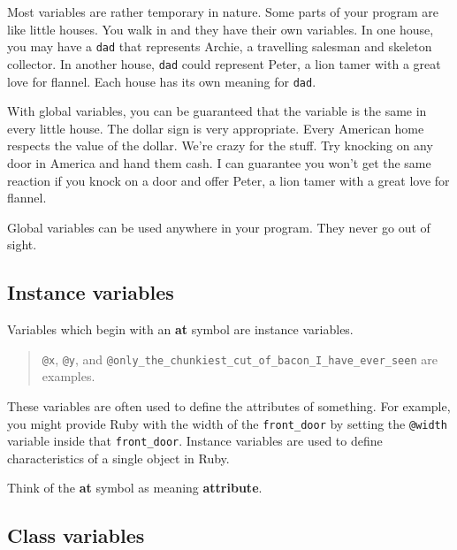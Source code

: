 \documentclass[10pt,twoside]{report}
\begin{document}
Most variables are rather temporary in nature.  Some parts of your
program are like little houses. You walk in and they have their own
variables.  In one house, you may have a
\lstinline[breaklines=true]|dad| that represents Archie, a travelling
salesman and skeleton collector.  In another house,
\lstinline[breaklines=true]|dad| could represent Peter, a lion tamer
with a great love for flannel.  Each house has its own meaning for
\lstinline[breaklines=true]|dad|.

With global variables, you can be guaranteed that the variable is the
same in every little house. The dollar sign is very appropriate.
Every American home respects the value of the dollar.  We're crazy for
the stuff.  Try knocking on any door in America and hand them cash.  I
can guarantee you won't get the same reaction if you knock on a door
and offer Peter, a lion tamer with a great love for flannel.

Global variables can be used anywhere in your program.  They never go
out of sight.




\subsection{Instance variables}



Variables which begin with an {\bf at} symbol are instance variables.

\begin{quote}
\lstinline[breaklines=true]|@x|, \lstinline[breaklines=true]|@y|, and
\lstinline[breaklines=true]|@only_the_chunkiest_cut_of_bacon_I_have_ever_seen|
are examples.\end{quote}


These variables are often used to define the attributes of something.
For example, you might provide Ruby with the width of the
\lstinline[breaklines=true]|front_door| by setting the
\lstinline[breaklines=true]|@width| variable inside that
\lstinline[breaklines=true]|front_door|.  Instance variables are used
to define characteristics of a single object in Ruby.

Think of the {\bf at} symbol as meaning {\bf attribute}.




\subsection{Class variables}
\end{document}
